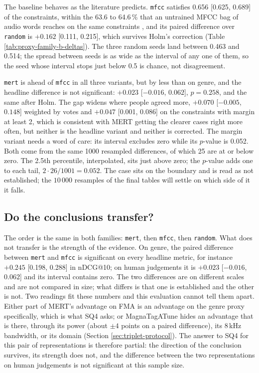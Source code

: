 The baseline behaves as the literature predicts. \texttt{mfcc} satisfies
0.656 [0.625, 0.689] of the constraints, within the 63.6 to 64.6\,\% that an
untrained MFCC bag of audio words reaches on the same constraints
\cite{Karamanolakis2016}, and its paired difference over \texttt{random} is
$+0.162$ [0.111, 0.215], which survives Holm's correction
(Table \ref{tab:proxy-family-b-deltas}). The three random seeds land between
0.463 and 0.514; the spread between seeds is as wide as the interval of any one
of them, so the seed whose interval stops just below 0.5 is chance, not
disagreement.

\texttt{mert} is ahead of \texttt{mfcc} in all three variants, but by less than
on genre, and the headline difference is not significant: $+0.023$
[$-0.016$, $0.062$], $p = 0.258$, and the same after Holm. The gap widens where
people agreed more, $+0.070$ [$-0.005$, $0.148$] weighted by votes and
$+0.047$ [0.001, 0.086] on the constraints with margin at least 2, which is
consistent with MERT getting the clearer cases right more often, but neither is
the headline variant and neither is corrected. The margin variant needs a word
of care: its interval excludes zero while its $p$-value is 0.052. Both come
from the same 1000 resampled differences, of which 25 are at or below zero. The
2.5th percentile, interpolated, sits just above zero; the $p$-value adds one to
each tail, $2 \cdot 26 / 1001 = 0.052$. The case sits on the boundary and is
read as not established; the $10\,000$ resamples of the final tables will
settle on which side of it it falls.

\subsection{Do the conclusions transfer?}
\label{sec:results-proxy-transfer}

The order is the same in both families: \texttt{mert}, then \texttt{mfcc},
then \texttt{random}. What does not transfer is the strength of the evidence.
On genre, the paired difference between \texttt{mert} and \texttt{mfcc} is
significant on every headline metric, for instance $+0.245$ [0.198, 0.288] in
nDCG@10; on human judgements it is $+0.023$ [$-0.016$, $0.062$] and its
interval contains zero. The two differences are on different scales and are
not compared in size; what differs is that one is established and the other
is not. Two readings fit these numbers and this evaluation cannot tell
them apart. Either part of MERT's advantage on FMA is an advantage on the
genre proxy specifically, which is what SQ4 asks; or MagnaTagATune hides an
advantage that is there, through its power (about $\pm 4$ points on a paired
difference), its 8\,kHz bandwidth, or its domain
(Section \ref{sec:triplet-protocol}). The answer to SQ4 for this pair of
representations is therefore partial: the direction of the conclusion
survives, its strength does not, and the difference between the two
representations on human judgements is not significant at this sample size.

